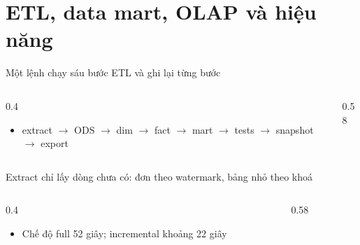 \section[ETL, mart, OLAP]{ETL, data mart, OLAP và hiệu năng}

\begin{frame}{Một lệnh chạy sáu bước ETL và ghi lại từng bước}
\begin{columns}[T]\begin{column}{0.4\textwidth}
\begin{itemize}
  \item extract $\rightarrow$ ODS $\rightarrow$ dim $\rightarrow$ fact $\rightarrow$ mart $\rightarrow$ tests $\rightarrow$ snapshot $\rightarrow$ export
\end{itemize}
\end{column}\begin{column}{0.58\textwidth}
\begin{center}\end{center}
\end{column}\end{columns}

\end{frame}

\begin{frame}{Extract chỉ lấy dòng chưa có: đơn theo watermark, bảng nhỏ theo khoá}
\begin{columns}[T]\begin{column}{0.4\textwidth}
\begin{itemize}
  \item Chế độ full 52 giây; incremental khoảng 22 giây
\end{itemize}
\end{column}\begin{column}{0.58\textwidth}
\begin{center}\end{center}
\end{column}\end{columns}

\end{frame}


